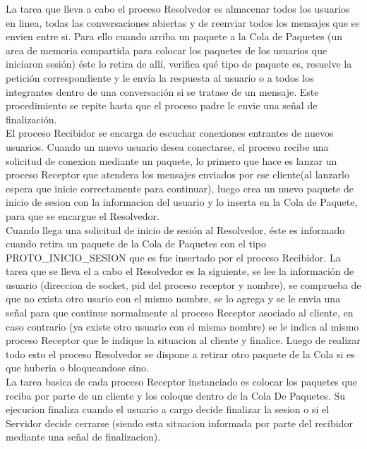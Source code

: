 \documentclass[a4paper,12pt,titlepage]{article}
\begin{document}
La tarea que lleva a cabo el proceso Resolvedor es almacenar todos los usuarios en linea, todas las conversaciones abiertas y de reenviar 
todos los mensajes que se envien entre si. Para ello cuando arriba un paquete a la Cola de Paquetes (un area de memoria compartida para colocar 
los paquetes de los usuarios que iniciaron sesión) éste lo retira de allí, verifica qué tipo de paquete es, resuelve la petición correspondiente y 
le envía la respuesta al usuario o a todos los integrantes dentro de una conversación si se tratase de un mensaje. Este procedimiento se repite 
hasta que el proceso padre le envie una señal de finalización.\\

El proceso Recibidor se encarga de escuchar conexiones entrantes de nuevos usuarios. Cuando un nuevo usuario 
desea conectarse, el proceso recibe una solicitud de conexion mediante un paquete, lo primero que hace es lanzar un proceso Receptor que atendera los mensajes enviados por ese cliente(al lanzarlo espera que inicie correctamente para continuar), luego crea un nuevo paquete de inicio de sesion con la informacion del usuario y lo inserta en la Cola de Paquete, para que se encargue el Resolvedor.\\

Cuando llega una solicitud de inicio de sesión al Resolvedor, éste es informado cuando retira un paquete de la Cola de Paquetes con el tipo PROTO\_INICIO\_SESION que es fue insertado por el proceso
Recibidor. La tarea que se lleva el a cabo el Resolvedor es la siguiente, se lee la información de usuario (direccion de socket, pid del proceso receptor y nombre), se comprueba de que no exista otro usario con el mismo nombre, se lo agrega y se le envia una señal para que continue normalmente al proceso Receptor asociado al cliente, en caso contrario (ya existe otro usuario con el mismo nombre) se le indica al mismo proceso Receptor que le indique la situacion al cliente y finalice.
 Luego de realizar todo esto el proceso Resolvedor se dispone a retirar otro paquete de la Cola si es que huberia o bloqueandose sino.\\

La tarea basica de cada proceso Receptor instanciado es colocar los paquetes que reciba por parte de un cliente y los coloque dentro de la Cola De Paquetes. Su ejecucion finaliza cuando el usuario a cargo decide finalizar la sesion o si el Servidor decide cerrarse (siendo esta situacion informada por parte del recibidor mediante una señal de finalizacion).
\end{document}
